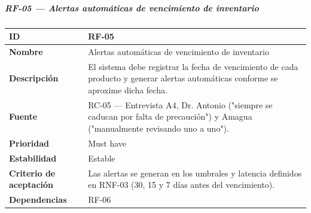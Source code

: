 \documentclass[
]{article}
\newcounter{none} %
\begin{document}
\subparagraph{RF-05 --- Alertas automáticas de vencimiento de
inventario}\label{rf-05-alertas-automuxe1ticas-de-vencimiento-de-inventario}

{\def\LTcaptype{none} %
\begin{longtable}[]{@{}
  >{\raggedright\arraybackslash}p{}
  >{\raggedright\arraybackslash}p{}@{}}
\toprule\noalign{}
\begin{minipage}[b]{\linewidth}\raggedright
\textbf{ID}
\end{minipage} & \begin{minipage}[b]{\linewidth}\raggedright
RF-05
\end{minipage} \\
\midrule\noalign{}
\endhead
\bottomrule\noalign{}
\endlastfoot
\textbf{Nombre} & \begin{minipage}[t]{\linewidth}\raggedright
Alertas automáticas de vencimiento de inventario
\end{minipage} \\
\textbf{Descripción} & \begin{minipage}[t]{\linewidth}\raggedright
El sistema debe registrar la fecha de vencimiento de cada producto y
generar alertas automáticas conforme se aproxime dicha fecha.
\end{minipage} \\
\textbf{Fuente} & \begin{minipage}[t]{\linewidth}\raggedright
RC-05 --- Entrevista A4, Dr. Antonio ("siempre se caducan por falta de
precaución") y Amagua ("manualmente revisando uno a uno").
\end{minipage} \\
\textbf{Prioridad} & \begin{minipage}[t]{\linewidth}\raggedright
Must have
\end{minipage} \\
\textbf{Estabilidad} & \begin{minipage}[t]{\linewidth}\raggedright
Estable
\end{minipage} \\
\textbf{Criterio de aceptación} &
\begin{minipage}[t]{\linewidth}\raggedright
Las alertas se generan en los umbrales y latencia definidos en RNF-03
(30, 15 y 7 días antes del vencimiento).
\end{minipage} \\
\textbf{Dependencias} & \begin{minipage}[t]{\linewidth}\raggedright
RF-06
\end{minipage} \\
\end{longtable}
}
\end{document}
